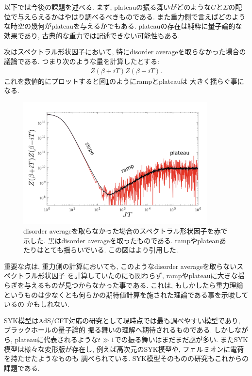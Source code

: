 以下では今後の課題を述べる. 
まず, plateauの振る舞いがどのような$G$と$\Sigma$の配位で与えらえるかはやはり調べるべきものである. 
また重力側で言えばどのような時空の幾何がplateauを与えるかでもある. 
plateauの存在は純粋に量子論的な効果であり, 古典的な重力では記述できない可能性もある. 

次はスペクトラル形状因子において, 特にdisorder averageを取らなかった場合の議論である. 
つまり次のような量を計算したとする:
\begin{align}
	Z(\beta + iT)Z(\beta - iT).
\end{align}
これを数値的にプロットすると図\ref{fig:non_disorder_averaged_g}のようにrampとplateauは
大きく揺らぐ事になる. 
\begin{figure}[ht]
	\centering
	\includegraphics[width=10cm]{figures/non_disorder_averaged_g}
	\caption{disorder averageを取らなかった場合のスペクトラル形状因子を赤で示した. 
	黒はdisorder averageを取ったものである. 
	rampやplateauあたりはとても揺らいでいる. この図は\cite{stanford_chaos}より引用した. }
	\label{fig:non_disorder_averaged_g}
\end{figure}

重要な点は, 重力側の計算においても, このようなdisorder averageを取らないスペクトラル形状因子
を計算していたのにも関わらず, rampやplateauに大きな揺らぎを与えるものが見つからなかった事である. 
これは, もしかしたら重力理論というものは少なくとも何らかの期待値計算を施された理論である事を示唆しているの
かもしれない\cite{stanford_chaos}. 

SYK模型はAdS/CFT対応の研究として現時点では最も調べやすい模型であり, ブラックホールの量子論的
振る舞いの理解へ期待されるものである. 
しかしながら, plateauに代表されるような$t \gg 1$での振る舞いはまだまだ謎が多い. 
またSYK模型は様々な変形版が存在し, 例えば高次元のSYK模型や, フェルミオンに電荷を持たせたようなものも
調べられている\cite{gaikwad}\cite{berkooz}. 
SYK模型そのものの研究もこれからの課題である. 

\pagebreak
